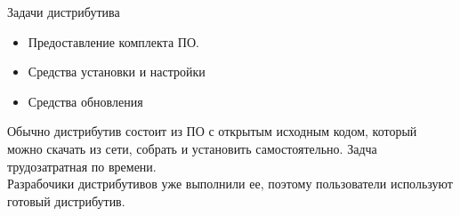 \begin{frame}{Задачи дистрибутива}
	\begin{itemize}
		\item Предоставление комплекта ПО. 
		\item Средства установки и настройки
		\item Средства обновления
	\end{itemize}
        Обычно дистрибутив состоит из ПО с открытым исходным кодом, который можно скачать из сети, собрать и установить самостоятельно.  Задча трудозатратная по времени. \\
Разрабочики дистрибутивов уже выполнили ее, поэтому пользователи используют готовый дистрибутив.
\end{frame}
